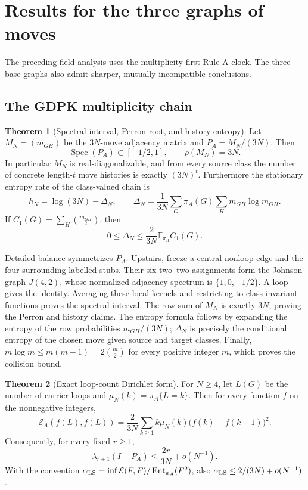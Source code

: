 \documentclass[11pt]{article}
\makeatletter
\newcommand{\E}{\mathbb E}
\newcommand{\Spec}{\operatorname{Spec}}
\theoremstyle{definition}
\newtheorem{theorem}{Theorem}
\renewenvironment{proof}[1][\proofname]{\par
  \pushQED{\qed}%
  \normalfont \topsep6\p@\@plus6\p@\relax
  \trivlist
  \item[\hskip\labelsep\bfseries #1\@addpunct{.}]\ignorespaces
}{%
  \popQED\endtrivlist\@endpefalse
}
\makeatother
\begin{document}
\section{Results for the three graphs of moves}

The preceding field analysis uses the multiplicity-first Rule-A clock.  The
three base graphs also admit sharper, mutually incompatible conclusions.

\subsection{The GDPK multiplicity chain}

\begin{theorem}[Spectral interval, Perron root, and history entropy]
Let $M_N=(m_{GH})$ be the $3N$-move adjacency matrix and
$P_A=M_N/(3N)$.  Then
\[
    \Spec(P_A)\subset[-1/2,1],
    \qquad \rho(M_N)=3N.
\]
In particular $M_N$ is real-diagonalizable, and from every source class the
number of concrete length-$t$ move histories is exactly $(3N)^t$.
Furthermore the stationary entropy rate of the class-valued chain is
\[
 h_N=\log(3N)-\Delta_N,
 \qquad
 \Delta_N=\frac1{3N}\sum_G\pi_A(G)\sum_Hm_{GH}\log m_{GH}.
\]
If $C_1(G)=\sum_H\binom{m_{GH}}2$, then
\[
 0\le\Delta_N\le\frac{2}{3N}\E_{\pi_A}C_1(G).
\]
\end{theorem}

\begin{proof}
Detailed balance symmetrizes $P_A$.  Upstairs, freeze a central nonloop edge
and the four surrounding labelled stubs.  Their six two--two assignments form
the Johnson graph $J(4,2)$, whose normalized adjacency spectrum is
$\{1,0,-1/2\}$.  A loop gives the identity.  Averaging these local kernels and
restricting to class-invariant functions proves the spectral interval.  The
row sum of $M_N$ is exactly $3N$, proving the Perron and history claims.  The
entropy formula follows by expanding the entropy of the row probabilities
$m_{GH}/(3N)$; $\Delta_N$ is precisely the conditional entropy of the chosen
move given source and target classes.  Finally,
$m\log m\le m(m-1)=2\binom m2$ for every positive integer $m$, which proves
the collision bound.
\end{proof}

\begin{theorem}[Exact loop-count Dirichlet form]
For $N\ge4$, let $L(G)$ be the number of carrier loops and
$\mu_N(k)=\pi_A\{L=k\}$.  Then for every function $f$ on the nonnegative
integers,
\[
 \mathcal E_A(f(L),f(L))
 =\frac{2}{3N}\sum_{k\ge1}k\mu_N(k)
       \bigl(f(k)-f(k-1)\bigr)^2.
\]
Consequently, for every fixed $r\ge1$,
\[
 \lambda_{r+1}(I-P_A)\le\frac{2r}{3N}+o(N^{-1}).
\]
With the convention
$\alpha_{\rm LS}=\inf\mathcal E(F,F)/\operatorname{Ent}_{\pi_A}(F^2)$,
also $\alpha_{\rm LS}\le2/(3N)+o(N^{-1})$.
\end{theorem}
\end{document}
